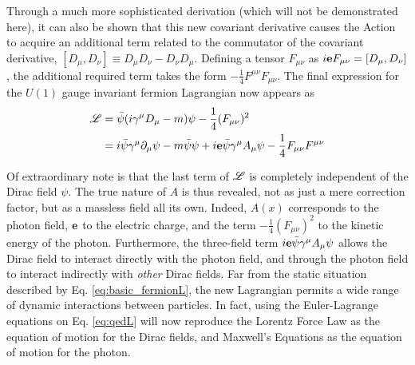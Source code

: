     Through a much more sophisticated derivation (which will not be demonstrated here),
        it can also be shown that this new covariant derivative causes the Action to acquire an additional term 
        related to the commutator of the covariant derivative, $[D_\mu, D_\nu] \equiv D_\mu D_\nu - D_\nu D_\mu$.
    Defining a tensor $F_{\mu\nu}$ as $i\mathbf{e} F_{\mu\nu} = [D_\mu, D_\nu]$,
        the additional required term takes the form $-\frac{1}{4}F^{\mu\nu}F_{\mu\nu}$.
    The final expression for the $U(1)$ gauge invariant fermion Lagrangian now appears as
    \begin{equation} \label{eq:qedL} \begin{split}
        \mathscr{L} &= \bar{\psi} (i\gamma^\mu D_\mu - m) \psi - \frac{1}{4}(F_{\mu\nu})^2
        \\&= i \bar{\psi} \gamma^\mu \partial_\mu \psi
            - m \bar{\psi} \psi
            + i \mathbf{e} \bar{\psi} \gamma^\mu A_\mu \psi
            - \frac{1}{4}F_{\mu\nu}F^{\mu\nu}
    \end{split} \end{equation}

    Of extraordinary note is that the last term of $\mathscr{L}$ is completely independent of the Dirac field $\psi$.
    The true nature of $A$ is thus revealed, not as just a mere correction factor,
        but as a massless field all its own.
    Indeed, $A(x)$ corresponds to the photon field, $\mathbf{e}$ to the electric charge,
        and the term $-\frac{1}{4}(F_{\mu\nu})^2$ to the kinetic energy of the photon.
    Furthermore, the three-field term $i \mathbf{e} \bar{\psi} \gamma^\mu A_\mu \psi$
        allows the Dirac field to interact directly with the photon field,
        and through the photon field to interact indirectly with \textit{other} Dirac fields.
    Far from the static situation described by Eq. \ref{eq:basic_fermionL},
        the new Lagrangian permits a wide range of dynamic interactions between particles.
    In fact, using the Euler-Lagrange equations on Eq. \ref{eq:qedL}
        will now reproduce the Lorentz Force Law as the equation of motion for the Dirac fields,
        and Maxwell's Equations as the equation of motion for the photon.

